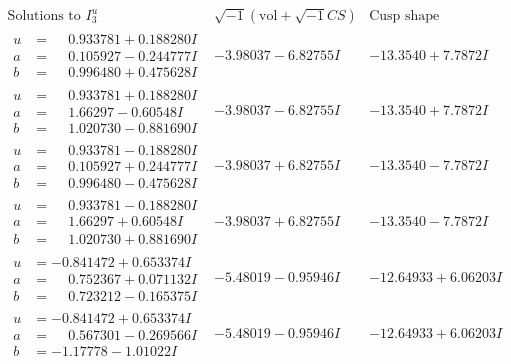 \documentclass[1p]{elsarticle_modified}
\theoremstyle{definition}
\newcommand{\I}{\sqrt{-1}}
\begin{document}
$$\begin{array}{c|c|c}  
\text{Solutions to }I^u_{3}& \I (\text{vol} + \sqrt{-1}CS) & \text{Cusp shape}\\
 \hline 
\begin{aligned}
u &= \phantom{-}0.933781 + 0.188280 I \\
a &= \phantom{-}0.105927 - 0.244777 I \\
b &= \phantom{-}0.996480 + 0.475628 I\end{aligned}
 & -3.98037 - 6.82755 I & -13.3540 + 7.7872 I \\ \hline\begin{aligned}
u &= \phantom{-}0.933781 + 0.188280 I \\
a &= \phantom{-}1.66297 - 0.60548 I \\
b &= \phantom{-}1.020730 - 0.881690 I\end{aligned}
 & -3.98037 - 6.82755 I & -13.3540 + 7.7872 I \\ \hline\begin{aligned}
u &= \phantom{-}0.933781 - 0.188280 I \\
a &= \phantom{-}0.105927 + 0.244777 I \\
b &= \phantom{-}0.996480 - 0.475628 I\end{aligned}
 & -3.98037 + 6.82755 I & -13.3540 - 7.7872 I \\ \hline\begin{aligned}
u &= \phantom{-}0.933781 - 0.188280 I \\
a &= \phantom{-}1.66297 + 0.60548 I \\
b &= \phantom{-}1.020730 + 0.881690 I\end{aligned}
 & -3.98037 + 6.82755 I & -13.3540 - 7.7872 I \\ \hline\begin{aligned}
u &= -0.841472 + 0.653374 I \\
a &= \phantom{-}0.752367 + 0.071132 I \\
b &= \phantom{-}0.723212 - 0.165375 I\end{aligned}
 & -5.48019 - 0.95946 I & -12.64933 + 6.06203 I \\ \hline\begin{aligned}
u &= -0.841472 + 0.653374 I \\
a &= \phantom{-}0.567301 - 0.269566 I \\
b &= -1.17778 - 1.01022 I\end{aligned}
 & -5.48019 - 0.95946 I & -12.64933 + 6.06203 I \\ \hline\begin{aligned}

\end{aligned}
\end{array}$$
\end{document}
